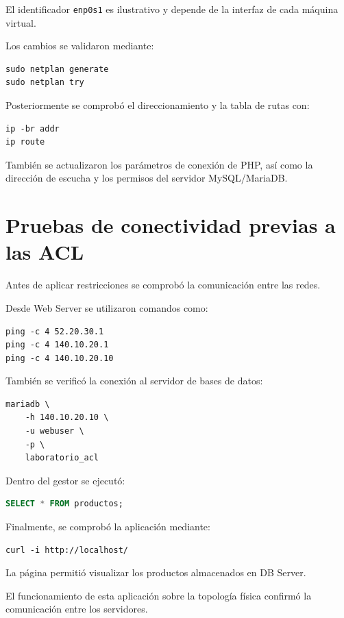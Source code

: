 \documentclass[12pt,a4paper]{article}
\begin{document}
El identificador \texttt{enp0s1}
es ilustrativo y depende de
la interfaz de cada máquina virtual.

Los cambios se validaron mediante:

\begin{lstlisting}
sudo netplan generate
sudo netplan try
\end{lstlisting}

Posteriormente se comprobó el
direccionamiento y la tabla
de rutas con:

\begin{lstlisting}
ip -br addr
ip route
\end{lstlisting}

También se actualizaron
los parámetros de conexión
de PHP, así como la dirección
de escucha y los permisos del
servidor MySQL/MariaDB.


\section{Pruebas de conectividad previas a las ACL}

Antes de aplicar restricciones
se comprobó la comunicación
entre las redes.

Desde Web Server se utilizaron
comandos como:

\begin{lstlisting}
ping -c 4 52.20.30.1
ping -c 4 140.10.20.1
ping -c 4 140.10.20.10
\end{lstlisting}

También se verificó la conexión
al servidor de bases de datos:

\begin{lstlisting}
mariadb \
    -h 140.10.20.10 \
    -u webuser \
    -p \
    laboratorio_acl
\end{lstlisting}

Dentro del gestor se ejecutó:

\begin{lstlisting}[language=SQL]
SELECT * FROM productos;
\end{lstlisting}

Finalmente, se comprobó la
aplicación mediante:

\begin{lstlisting}
curl -i http://localhost/
\end{lstlisting}

La página permitió visualizar
los productos almacenados en
DB Server.

El funcionamiento de esta
aplicación sobre la topología
física confirmó la comunicación
entre los servidores.
\end{document}
